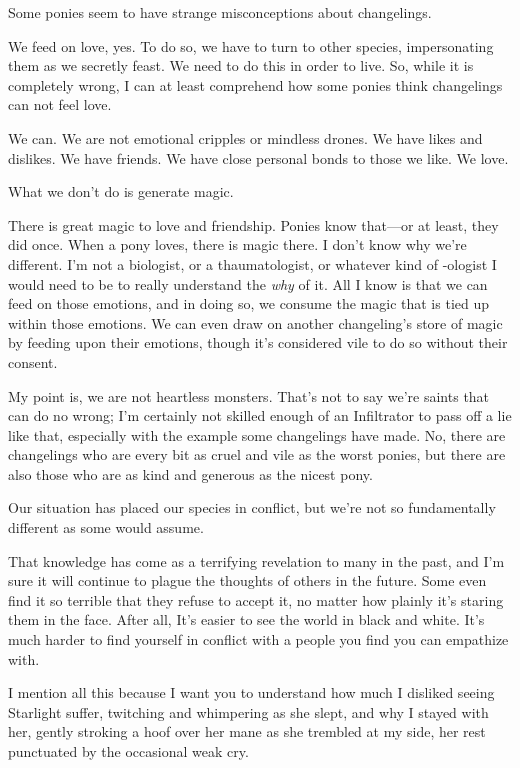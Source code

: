 Some ponies seem to have strange misconceptions about changelings.

We feed on love, yes. To do so, we have to turn to other species, impersonating them as we secretly feast. We need to do this in order to live. So, while it is completely wrong, I can at least comprehend how some ponies think changelings can not feel love.

We can. We are not emotional cripples or mindless drones. We have likes and dislikes. We have friends. We have close personal bonds to those we like. We love.

What we don’t do is generate magic.

There is great magic to love and friendship. Ponies know that—or at least, they did once. When a pony loves, there is magic there. I don’t know why we’re different. I’m not a biologist, or a thaumatologist, or whatever kind of -ologist I would need to be to really understand the \textit{why} of it. All I know is that we can feed on those emotions, and in doing so, we consume the magic that is tied up within those emotions. We can even draw on another changeling’s store of magic by feeding upon their emotions, though it’s considered vile to do so without their consent.

My point is, we are not heartless monsters. That’s not to say we’re saints that can do no wrong; I’m certainly not skilled enough of an Infiltrator to pass off a lie like that, especially with the example some changelings have made. No, there are changelings who are every bit as cruel and vile as the worst ponies, but there are also those who are as kind and generous as the nicest pony.

Our situation has placed our species in conflict, but we’re not so fundamentally different as some would assume.

That knowledge has come as a terrifying revelation to many in the past, and I’m sure it will continue to plague the thoughts of others in the future. Some even find it so terrible that they refuse to accept it, no matter how plainly it’s staring them in the face. After all, It’s easier to see the world in black and white. It’s much harder to find yourself in conflict with a people you find you can empathize with.

I mention all this because I want you to understand how much I disliked seeing Starlight suffer, twitching and whimpering as she slept, and why I stayed with her, gently stroking a hoof over her mane as she trembled at my side, her rest punctuated by the occasional weak cry.

